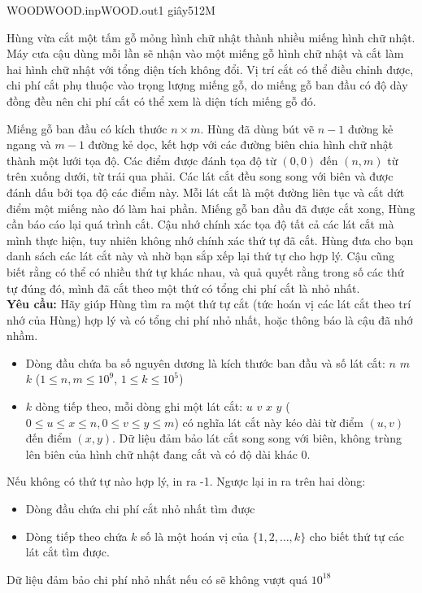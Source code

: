 \begin{problem}{WOOD}{WOOD.inp}{WOOD.out}{1 giây}{512M}
\small{

Hùng vừa cắt một tấm gỗ mỏng hình chữ nhật thành nhiều miếng hình chữ nhật. Máy cưa cậu dùng mỗi lần sẽ nhận vào một miếng gỗ hình chữ nhật và cắt làm hai hình chữ nhật với tổng diện tích không đổi. Vị trí cắt có thể điều chỉnh được, chi phí cắt phụ thuộc vào trọng lượng miếng gỗ, do miếng gỗ ban đầu có độ dày đồng đều nên chi phí cắt có thể xem là diện tích miếng gỗ đó.\\
\begin{center}
\end{center}
Miếng gỗ ban đầu có kích thước $n \times m$. Hùng đã dùng bút vẽ $n-1$ đường kẻ ngang và $m-1$ đường kẻ dọc, kết hợp với các đường biên chia hình chữ nhật thành một lưới tọa độ. Các điểm được đánh tọa độ từ $(0,0)$ đến $(n,m)$ từ trên xuống dưới, từ trái qua phải. Các lát cắt đều song song với biên và được đánh dấu bởi tọa độ các điểm này. Mỗi lát cắt là một đường liên tục và cắt dứt điểm một miếng nào đó làm hai phần. Miếng gỗ ban đầu đã được cắt xong, Hùng cần báo cáo lại quá trình cắt. Cậu nhớ chính xác tọa độ tất cả các lát cắt mà mình thực hiện, tuy nhiên không nhớ chính xác thứ tự đã cắt. Hùng đưa cho bạn danh sách các lát cắt này và nhờ bạn sắp xếp lại thứ tự cho hợp lý. Cậu cũng biết rằng có thể có nhiều thứ tự khác nhau, và quả quyết rằng trong số các thứ tự đúng đó, mình đã cắt theo một thứ có tổng chi phí cắt là nhỏ nhất.\\
\textbf{Yêu cầu:} Hãy giúp Hùng tìm ra một thứ tự cắt (tức hoán vị các lát cắt theo trí nhớ của Hùng) hợp lý và có tổng chi phí nhỏ nhất, hoặc thông báo là cậu đã nhớ nhầm.

\InputFile
\begin{itemize}
	\item Dòng đầu chứa ba số nguyên dương là kích thước ban đầu và số lát cắt: $n$ $m$ $k$ ($1 \leq n,m \leq 10^9$, $1 \leq k \leq 10^5$)
	\item $k$ dòng tiếp theo, mỗi dòng ghi một lát cắt: $u$ $v$ $x$ $y$ ($0 \leq u \leq x \leq n, 0 \leq v \leq y \leq m$) có nghĩa lát cắt này kéo dài từ điểm $(u,v)$ đến điểm $(x,y)$. Dữ liệu đảm bảo lát cắt song song với biên, không trùng lên biên của hình chữ nhật đang cắt và có độ dài khác 0.
\end{itemize}

\OutputFile
Nếu không có thứ tự nào hợp lý, in ra -1. Ngược lại in ra trên hai dòng:
\begin{itemize}
	\item Dòng đầu chứa chi phí cắt nhỏ nhất tìm được
	\item Dòng tiếp theo chứa $k$ số là một hoán vị của $\{1, 2, \ldots, k\}$ cho biết thứ tự các lát cắt tìm được.
\end{itemize}
Dữ liệu đảm bảo chi phí nhỏ nhất nếu có sẽ không vượt quá $10^{18}$

}
\end{problem}

